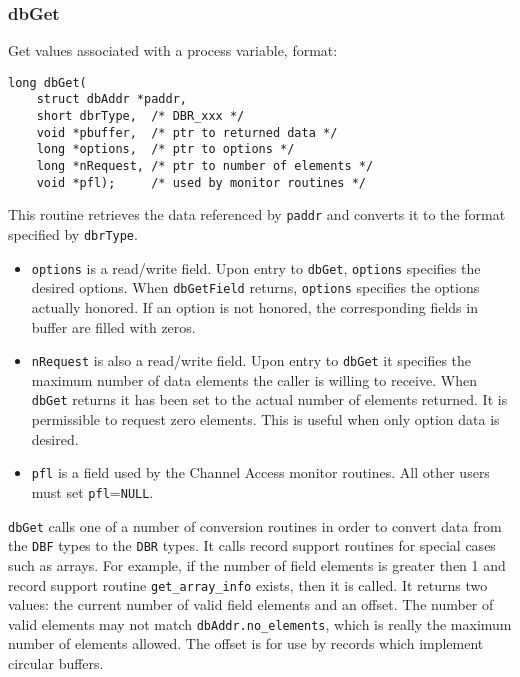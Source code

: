 \subsubsection{dbGet}

Get values associated with a process variable, format:

\begin{verbatim}long dbGet(
    struct dbAddr *paddr,
    short dbrType,  /* DBR_xxx */
    void *pbuffer,  /* ptr to returned data */
    long *options,  /* ptr to options */
    long *nRequest, /* ptr to number of elements */
    void *pfl);     /* used by monitor routines */
\end{verbatim}This routine retrieves the data referenced by \verb|paddr| and converts it to the format specified by \verb|dbrType|. 

\begin{itemize}\item \verb|options| is a read/write field. Upon entry to \verb|dbGet|, \verb|options| specifies the desired options. When 
\verb|dbGetField| returns, \verb|options| specifies the options actually honored. If an option is not honored, the 
corresponding fields in buffer are filled with zeros.

\item \verb|nRequest| is also a read/write field. Upon entry to \verb|dbGet| it specifies the maximum number of data elements the 
caller is willing to receive. When \verb|dbGet| returns it has been set to the actual number of elements returned. It is 
permissible to request zero elements. This is useful when only option data is desired.

\item \verb|pfl| is a field used by the Channel Access monitor routines. All other users must set \verb|pfl|=\verb|NULL|.

\end{itemize}\verb|dbGet| calls one of a number of conversion routines in order to convert data from the \verb|DBF| types to the \verb|DBR| types. It calls 
record support routines for special cases such as arrays. For example, if the number of field elements is greater then 1 and 
record support routine \verb|get_array_info| exists, then it is called. It returns two values: the current number of valid field 
elements and an offset. The number of valid elements may not match \verb|dbAddr.no_elements|, which is really the 
maximum number of elements allowed. The offset is for use by records which implement circular buffers.

